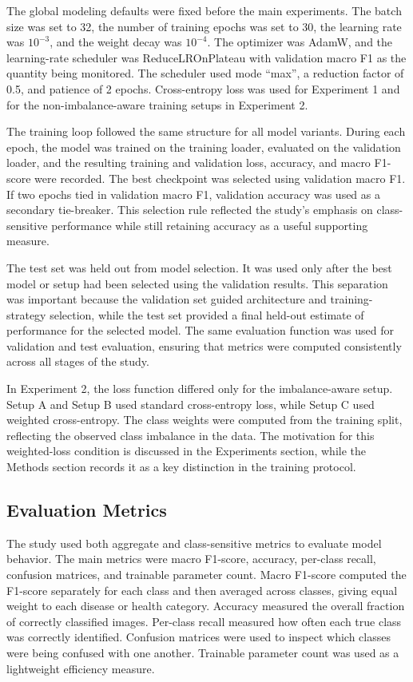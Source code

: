 \documentclass[11pt]{article}
\begin{document}
The global modeling defaults were fixed before the main experiments. The batch size was set to 32, the number of training epochs was set to 30, the learning rate was \(10^{-3}\), and the weight decay was \(10^{-4}\). The optimizer was AdamW, and the learning-rate scheduler was ReduceLROnPlateau with validation macro F1 as the quantity being monitored. The scheduler used mode ``max'', a reduction factor of 0.5, and patience of 2 epochs. Cross-entropy loss was used for Experiment 1 and for the non-imbalance-aware training setups in Experiment 2.

The training loop followed the same structure for all model variants. During each epoch, the model was trained on the training loader, evaluated on the validation loader, and the resulting training and validation loss, accuracy, and macro F1-score were recorded. The best checkpoint was selected using validation macro F1. If two epochs tied in validation macro F1, validation accuracy was used as a secondary tie-breaker. This selection rule reflected the study's emphasis on class-sensitive performance while still retaining accuracy as a useful supporting measure.

The test set was held out from model selection. It was used only after the best model or setup had been selected using the validation results. This separation was important because the validation set guided architecture and training-strategy selection, while the test set provided a final held-out estimate of performance for the selected model. The same evaluation function was used for validation and test evaluation, ensuring that metrics were computed consistently across all stages of the study.

In Experiment 2, the loss function differed only for the imbalance-aware setup. Setup A and Setup B used standard cross-entropy loss, while Setup C used weighted cross-entropy. The class weights were computed from the training split, reflecting the observed class imbalance in the data. The motivation for this weighted-loss condition is discussed in the Experiments section, while the Methods section records it as a key distinction in the training protocol.

\subsection{Evaluation Metrics}
\label{sec:evaluation_metrics}

The study used both aggregate and class-sensitive metrics to evaluate model behavior. The main metrics were macro F1-score, accuracy, per-class recall, confusion matrices, and trainable parameter count. Macro F1-score computed the F1-score separately for each class and then averaged across classes, giving equal weight to each disease or health category. Accuracy measured the overall fraction of correctly classified images. Per-class recall measured how often each true class was correctly identified. Confusion matrices were used to inspect which classes were being confused with one another. Trainable parameter count was used as a lightweight efficiency measure.
\end{document}
